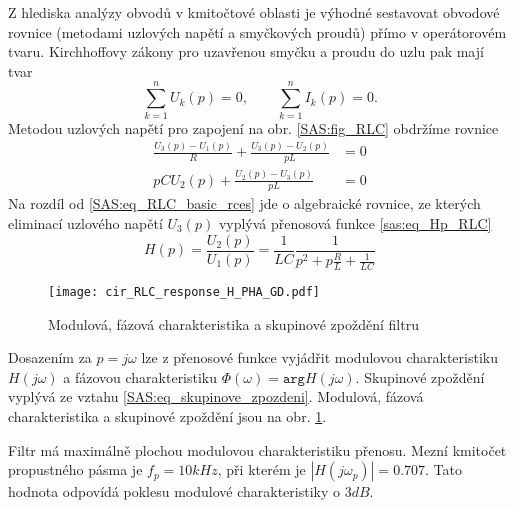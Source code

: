\begin{example}
    Z hlediska analýzy obvodů v kmitočtové oblasti je výhodné sestavovat obvodové rovnice (metodami
    uzlových napětí a smyčkových proudů) přímo v operátorovém tvaru. Kirchhoffovy zákony pro
    uzavřenou smyčku a proudu do uzlu pak mají tvar $$\sum_{k=1}^{n}U_k(p) = 0, \qquad
    \sum_{k=1}^{n}I_k(p) = 0.$$ Metodou uzlových napětí pro zapojení na obr. \ref{SAS:fig_RLC}
    obdržíme rovnice
    \begin{align}
      \frac{U_3(p)-U_1(p)}{R}+\frac{U_3(p)-U_2(p)}{pL} &=  0 \\
      pCU_2(p) + \frac{U_2(p)-U_3(p)}{pL}              &=  0 
    \end{align}
    Na rozdíl od \ref{SAS:eq_RLC_basic_rces} jde o algebraické rovnice, ze kterých eliminací
    uzlového napětí $U_3(p)$ vyplývá přenosová funkce \ref{sas:eq_Hp_RLC} $$H(p) =
    \frac{U_2(p)}{U_1(p)}=\frac{1}{LC}\frac{1}{p^2+p\frac{R}{L}+\frac{1}{LC}}$$

    \begin{figure}[ht!]
       \centering
       \texttt{[image: cir\_RLC\_response\_H\_PHA\_GD.pdf]}
       \caption{Modulová, fázová charakteristika a skupinové zpoždění filtru
               }\label{SAS:fig_ex01_RLC}
    \end{figure}    
    
    Dosazením za $p=j\omega$ lze z přenosové funkce vyjádřit modulovou charakteristiku $H(j\omega)$
    a fázovou charakteristiku $\Phi(\omega)= \texttt{arg} H(j\omega)$. Skupinové zpoždění vyplývá
    ze vztahu \ref{SAS:eq_skupinove_zpozdeni}. Modulová, fázová charakteristika a skupinové
    zpoždění jsou na obr. \ref{SAS:fig_ex01_RLC}.
    
    Filtr má maximálně plochou modulovou charakteristiku přenosu. Mezní kmitočet propustného pásma
    je $f_p = 10 kHz$, při kterém je $|H(j\omega_p)|= 0.707$. Tato hodnota odpovídá poklesu
    modulové charakteristiky o $3 dB$.

    
    \begin{lstlisting}[caption=SAS\_exam\_03\_Hp.m]
    \end{lstlisting}
\end{example} 
             
      